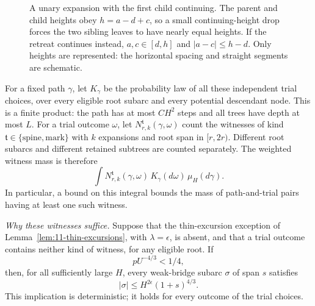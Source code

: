 \begin{figure}[ht]
\centering
{}
\caption{A unary expansion with the first child continuing. The parent
and child heights obey $h=a-d+c$, so a small continuing-height drop
forces the two sibling leaves to have nearly equal heights. If the
retreat continues instead, $a,c\in[d,h]$ and $|a-c|\le h-d$.
Only heights are represented: the horizontal spacing and straight
segments are schematic.}
\label{fig:11-sibling-heights}
\end{figure}

For a fixed path $\gamma$, let $K_\gamma$ be the probability law of
all these independent trial choices, over every eligible root subarc
and every potential descendant node. This is a finite product: the
path has at most $CH^2$ steps and all trees have depth at most $L$.
For a trial outcome $\omega$, let $N^{\mathfrak t}_{r,k}(\gamma,\omega)$
count the witnesses of kind $\mathfrak t\in\{\mathrm{spine},\mathrm{mark}\}$
with $k$ expansions and root span in $[r,2r)$. Different root subarcs
and different retained subtrees are counted separately. The weighted
witness mass is therefore
\[
 \int N^{\mathfrak t}_{r,k}(\gamma,\omega)\,
       K_\gamma(d\omega)\,\mu_H(d\gamma).
\]
In particular, a bound on this integral bounds the mass of path-and-trial
pairs having at least one such witness.

\smallskip\noindent\emph{Why these witnesses suffice.}
Suppose that the thin-excursion exception of
Lemma~\ref{lem:11-thin-excursions}, with $\lambda=\epsilon$, is absent,
and that a trial outcome contains neither kind of witness, for any
eligible root. If
\[
 pU^{-4/3}<1/4,
\]
then, for all sufficiently large $H$, every weak-bridge subarc $\sigma$
of span $s$ satisfies
\begin{equation}
 |\sigma|\le H^{2\epsilon}(1+s)^{4/3}.
 \label{eq:11-no-witness-length}
\end{equation}
This implication is deterministic; it holds for every outcome of the
trial choices.

